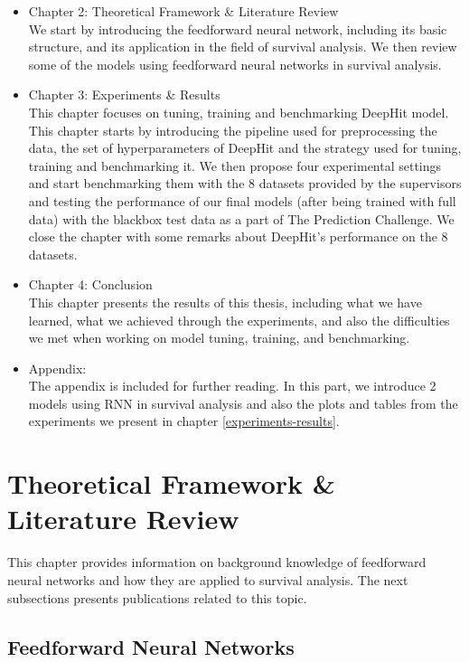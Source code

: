 \documentclass[
]{article}
\providecommand{\tightlist}{%
  \setlength{\itemsep}{0pt}\setlength{\parskip}{0pt}}
\begin{document}
\begin{itemize}
\tightlist
\item
  Chapter 2: Theoretical Framework \& Literature Review\\
  We start by introducing the feedforward neural network, including its basic structure, and its application in the field of survival analysis. We then review some of the models using feedforward neural networks in survival analysis.
\item
  Chapter 3: Experiments \& Results\\
  This chapter focuses on tuning, training and benchmarking DeepHit model. This chapter starts by introducing the pipeline used for preprocessing the data, the set of hyperparameters of DeepHit and the strategy used for tuning, training and benchmarking it. We then propose four experimental settings and start benchmarking them with the 8 datasets provided by the supervisors and testing the performance of our final models (after being trained with full data) with the blackbox test data as a part of The Prediction Challenge. We close the chapter with some remarks about DeepHit's performance on the 8 datasets.
\item
  Chapter 4: Conclusion\\
  This chapter presents the results of this thesis, including what we have learned, what we achieved through the experiments, and also the difficulties we met when working on model tuning, training, and benchmarking.
\item
  Appendix:\\
  The appendix is included for further reading. In this part, we introduce 2 models using RNN in survival analysis and also the plots and tables from the experiments we present in chapter \ref{experiments-results}.
\end{itemize}

\hypertarget{theoretical-framework-literature-review}{%
\section{Theoretical Framework \& Literature Review}\label{theoretical-framework-literature-review}}

This chapter provides information on background knowledge of feedforward neural networks and how they are applied to survival analysis. The next subsections presents publications related to this topic.

\hypertarget{feedforward-neural-networks}{%
\subsection{Feedforward Neural Networks}\label{feedforward-neural-networks}}
\end{document}
